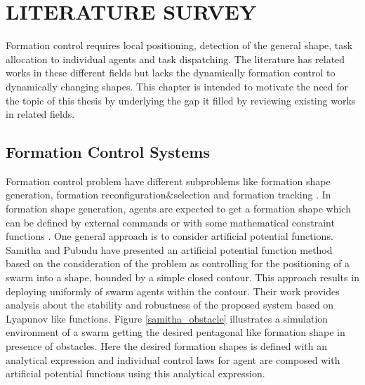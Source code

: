 

\chapter{LITERATURE SURVEY}
\label{chp:Literature Survey}







Formation control requires local positioning, detection of the general shape, task allocation to individual agents and task dispatching. The literature has related works in these different fields but lacks the dynamically formation control to dynamically changing shapes. This chapter is intended to motivate the need for the topic of this thesis by underlying the gap it filled by reviewing existing works in related fields. 

\section{Formation Control Systems}
Formation control problem have different subproblems like formation shape generation, formation reconfiguration$\&$selection and formation tracking \cite{12}.  
In formation shape generation, agents are expected to get a formation shape which can be defined by external commands or with some mathematical constraint functions \cite{16}.  One general approach is to consider artificial potential functions. Samitha and Pubudu \cite{17} have presented an artificial potential function method  based on the consideration of the problem as controlling for the positioning of a swarm into a shape, bounded by a simple closed contour. This approach results in deploying uniformly of swarm agents within the contour.  Their work provides analysis about the stability and robustness of the proposed system based on Lyapunov like functions. Figure \ref{samitha_obstacle} illustrates a simulation environment of a swarm getting the desired pentagonal like formation shape in presence of obstacles. Here the desired formation shapes is defined with an analytical expression and individual control laws for agent are composed with artificial potential functions using this analytical expression. 

